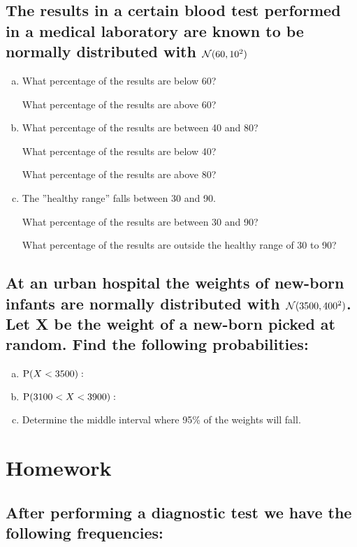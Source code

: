 \subsection{The results in a certain blood test performed in a medical laboratory are known to be normally distributed with $\N(60, 10^2)$}



\begin{enumerate}[a)]
\item What percentage of the results are below 60? 		 \hrulefill

	What percentage of the results are above 60? \hrulefill
\item What percentage of the results are between 40 and 80? 	 	 \hrulefill

What percentage of the results are below 40? 	 \hrulefill

What percentage of the results are above 80? 	 \hrulefill

\item The ''healthy range'' falls between 30 and 90. 

	What percentage of the results are between 30 and 90? \hrulefill

	What percentage of the results are outside the healthy range of 30 to 90? 	 \hrulefill
\end{enumerate}

\subsection {At an urban hospital the weights of new-born infants are normally distributed with $\N(3500, 400^2)$. Let X be the weight of a new-born picked at random. Find the following probabilities:}



\begin{enumerate}[a)]
\item $\P(X < 3500):$ \hrulefill 	
\item $\P(3100 < X < 3900):$ \hrulefill	
\item Determine the middle interval where 95\% of the weights will fall.

	 \hrulefill
\end{enumerate}


\section{Homework}

\subsection{After performing a diagnostic test we have the following frequencies:}

